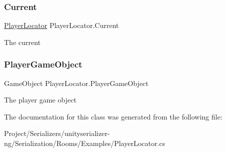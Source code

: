 \subsubsection{\texorpdfstring{Current}{Current}}
{\footnotesize\ttfamily \hyperlink{class_player_locator}{Player\+Locator} Player\+Locator.\+Current\hspace{0.3cm}{\ttfamily [static]}}



The current 

\mbox{\label{class_player_locator_a38ead089d27d49efa91465b756f9bc08}} 
\subsubsection{\texorpdfstring{Player\+Game\+Object}{PlayerGameObject}}
{\footnotesize\ttfamily Game\+Object Player\+Locator.\+Player\+Game\+Object\hspace{0.3cm}{\ttfamily [static]}}



The player game object 



The documentation for this class was generated from the following file\+:\begin{DoxyCompactItemize}
\item 
Project/\+Serializers/unityserializer-\/ng/\+Serialization/\+Rooms/\+Examples/Player\+Locator.\+cs\end{DoxyCompactItemize}
